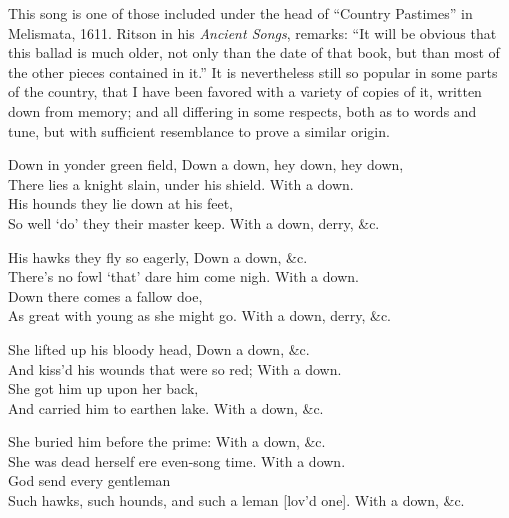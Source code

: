 This song is one of those included under the head of “Country Pastimes” in
Melismata, 1611. Ritson in his \textit{Ancient Songs}, remarks: “It will be obvious
that this ballad is much older, not only than the date of that book, but than most
of the other pieces contained in it.” It is nevertheless still so popular in some
parts of the country, that I have been favored with a variety of copies of it,
written down from memory; and all differing in some respects, both as to words
and tune, but with sufficient resemblance to prove a similar origin.

\noindent\begin{minipage}{\textwidth}
\medskip

\end{minipage}

\settowidth{\versewidth}{Down in yonder green field, Down a down, hey down, hey down,}
\begin{scverse}Down in yonder green field, Down a down, hey down, hey down,\\
There lies a knight slain, under his shield. With a down.\\
His hounds they lie down at his feet,\\
So well ‘do’ they their master keep. With a down, derry, \&c.

His hawks they fly so eagerly, Down a down, \&c.\\
There’s no fowl ‘that’ dare him come nigh. With a down.\\
Down there comes a fallow doe,\\
As great with young as she might go. With a down, derry, \&c.

She lifted up his bloody head, Down a down, \&c.\\
And kiss’d his wounds that were so red; With a down.\\
She got him up upon her back,\\
And carried him to earthen lake. With a down, \&c.

She buried him before the prime: With a down, \&c.\\
She was dead herself ere even-song time. With a down.\\
God send every gentleman\\
Such hawks, such hounds, and such a leman [lov’d one]. With a down, \&c.
\end{scverse}

